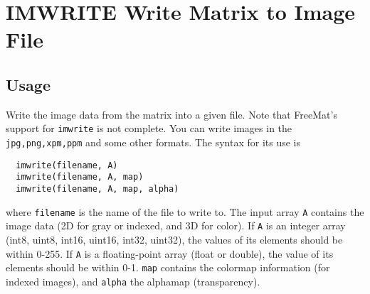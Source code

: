 \section{IMWRITE Write Matrix to Image File}

\subsection{Usage}

Write the image data from the matrix into a given file.  Note that
FreeMat's support for \verb|imwrite| is not complete.
You can write images in the \verb|jpg,png,xpm,ppm| and some other formats.
The syntax for its use is
\begin{verbatim}
  imwrite(filename, A)
  imwrite(filename, A, map)
  imwrite(filename, A, map, alpha)
\end{verbatim}
where \verb|filename| is the name of the file to write to.  The input array 
\verb|A| contains the image data (2D for gray or indexed, and 3D for color).  
If \verb|A| is an integer array (int8, uint8, int16, uint16, int32, uint32), 
the values of its elements should be within 0-255.  If \verb|A| is a 
floating-point array (float or double), the value of its elements should be 
within 0-1.  \verb|map| contains the colormap information (for indexed images),
and \verb|alpha| the alphamap (transparency).
